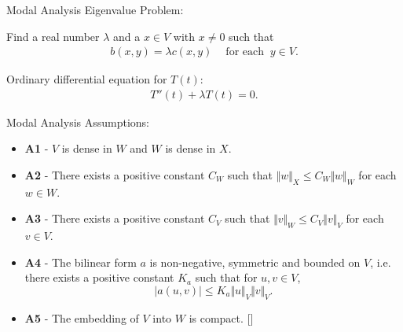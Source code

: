 \documentclass[8pt]{beamer}
\begin{document}
        \begin{frame}{Modal Analysis}
            Eigenvalue Problem:
        
            Find a real number $\lambda$ and a $x \in V$ with $x \neq 0$ such that
            \begin{eqnarray}
                b(x,y) = \lambda c(x,y) \ \ \ \ \textrm{ for each } \ y \in V.
            \end{eqnarray}

            Ordinary differential equation for $T(t)$:
            \begin{eqnarray}
                T''(t)  + \lambda T(t) = 0. \label{eq:1D_Model:ModalAnalysisODE}
            \end{eqnarray}
         \end{frame}
        
        \begin{frame}{Modal Analysis}
            Assumptions:
            \begin{itemize}
                \item[] \textbf{A1} - $V$ is dense in $W$ and $W$ is dense in $X$.
            
                \item[] \textbf{A2} - There exists a positive constant $C_{W}$ such that $\Vert w\Vert_{X} \leq C_{W}\Vert w\Vert_{W}$ for each $ w\in W$.
            
                \item[] \textbf{A3} - There exists a positive constant $C_{V}$ such that $\Vert v\Vert_{W} \leq C_{V}\Vert v\Vert_{V}$ for each $v \in V$.
            
                \item[] \textbf{A4} - The bilinear form $a$ is non-negative, symmetric and bounded on $V$, i.e. there exists a positive constant $K_a$ such that for $\displaystyle u,v \in V$, \[|a(u,v)| \leq K_a\Vert u \Vert_V \Vert v \Vert_V.\]
            
                \item[] \alert{\textbf{A5} - The embedding of $V$ into $W$ is compact.} [\cite{CVV18}]
            \end{itemize}
        \end{frame}
\end{document}
